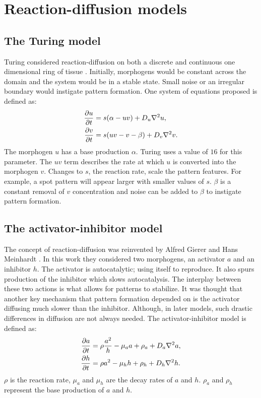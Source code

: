 \section{Reaction-diffusion models}
\subsection{The Turing model}
Turing considered reaction-diffusion on both a discrete and continuous one dimensional ring of tissue \cite{Turing1952}. Initially, morphogens would be constant across the domain and the system would be in a stable state. Small noise or an irregular boundary would instigate pattern formation. One system of equations proposed is defined as:
\begin{equation}
\begin{aligned} \label{eq:turingRD}
		\frac{\partial u}{\partial t} &= s(\alpha-uv) + D_u \nabla^2 u,\\
		\frac{\partial v}{\partial t} &= s(uv-v-\beta) + D_v \nabla^2 v.
\end{aligned}
\end{equation}
The morphogen $u$ has a base production $\alpha$. Turing uses a value of $16$ for this parameter. The $uv$ term describes the rate at which $u$ is converted into the morphogen $v$. Changes to $s$, the reaction rate, scale the pattern features. For example, a spot pattern will appear larger with smaller values of $s$. $\beta$ is a constant removal of $v$ concentration and noise can be added to $\beta$ to instigate pattern formation.

\subsection{The activator-inhibitor model}
The concept of reaction-diffusion was reinvented by Alfred Gierer and Hans Meinhardt \cite{Gierer1972}. In this work they considered two morphogens, an activator $a$ and an inhibitor $h$. The activator is autocatalytic; using itself to reproduce. It also spurs production of the inhibitor which slows autocatalysis. The interplay between these two actions is what allows for patterns to stabilize. It was thought that another key mechanism that pattern formation depended on is the activator diffusing much slower than the inhibitor. Although, in later models, such drastic differences in diffusion are not always needed. The activator-inhibitor model is defined as:
\begin{equation}
\begin{aligned} \label{eq:activatorInhibitorRD}
		\frac{\partial a}{\partial t} &= \rho \frac{a^2}{h} - \mu_a a + \rho_a + D_a \nabla^2 a,\\
		\frac{\partial h}{\partial t} &= \rho a^2 - \mu_h h  + \rho_h + D_h \nabla^2 h.
\end{aligned}
\end{equation}
$\rho$ is the reaction rate, $\mu_a$ and $\mu_h$ are the decay rates of $a$ and $h$. $\rho_a$ and $\rho_h$ represent the base production of $a$ and $h$. 


